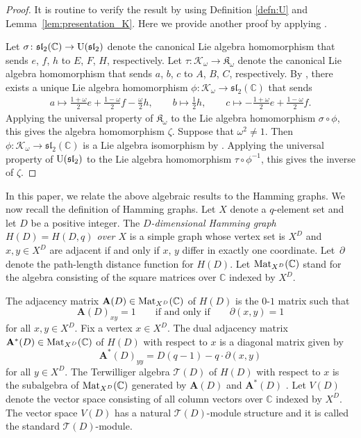 \documentclass[10pt,a4paper]{amsart}
\def\A{\mathbf A}
\def\C{\mathbb C}
\def\K{\mathfrak K_\omega}
\def\Mat{{\rm Mat}}
\def\T{\mathcal T}
\def\U{{\rm U}(\mathfrak{sl}_2)}
\numberwithin{equation}{section}
\begin{document}
\begin{proof}
It is routine to verify the result by using Definition \ref{defn:U} and Lemma~\ref{lem:presentation_K}. Here we provide another proof by applying \cite[Lemmas~2.12 and~2.13]{K&sl2}.

Let $\sigma\colon \mathfrak{sl}_2(\C)\to \U$ denote the canonical Lie algebra homomorphism that sends $e$, $f$, $h$ to $E$, $F$, $H$, respectively.
 Let $\tau\colon \mathcal K_\omega\to \K$ denote the canonical Lie algebra homomorphism that sends $a$, $b$, $c$ to $A$, $B$, $C$, respectively.
By \cite[Lemma 2.12]{K&sl2}, there exists a unique Lie algebra homomorphism $\phi\colon \mathcal K_\omega \to \mathfrak{sl}_2(\C)$ that sends
\begin{gather*}
a \mapsto \frac{1+\omega}{2} e+\frac{1-\omega}{2} f-\frac{\omega}{2} h,
\qquad
b \mapsto \frac{1}{2} h,
\qquad
c \mapsto -\frac{1+\omega}{2} e+\frac{1-\omega}{2} f.
\end{gather*}
Applying the universal property of $\K$ to the Lie algebra homomorphism $
\sigma\circ \phi$, this gives the algebra homomorphism $\zeta$. Suppose that $\omega^2\not=1$. Then $\phi\colon \mathcal K_\omega \to \mathfrak{sl}_2(\C)$ is a Lie algebra isomorphism by \cite[Lemma 2.13]{K&sl2}.
Applying the universal property of $\U$ to the Lie algebra homomorphism $\tau\circ \phi^{-1}$, this gives the inverse of $\zeta$.
\end{proof}



In this paper, we relate the above algebraic results to the Hamming graphs. We now recall the definition of Hamming graphs.
Let $X$ denote a $q$-element set and let $D$ be a positive integer.
The {\it $D$-dimensional Hamming graph $H(D)=H(D,q)$ over $X$} is a simple graph whose vertex set is $X^D$ and $x,y\in X^D$ are adjacent if and only if $x$, $y$ differ in exactly one coordinate. Let~$\partial$ denote the path-length distance function for $H(D)$.
Let $\Mat_{X^D}(\C)$ stand for the algebra consisting of the square matrices over $\C$ indexed by $X^D$.

The adjacency matrix $\A(D)\in \Mat_{X^D}(\C)$ of $H(D)$ is the $0$-$1$ matrix such that
\[
\A(D)_{xy}=1\qquad
\text{if and only if}\qquad
\partial(x,y)=1
\]
for all $x,y\in X^D$.
Fix a vertex $x\in X^D$. The dual adjacency matrix $\A^*(D)\in \Mat_{X^D}(\C)$ of $H(D)$ with respect to $x$ is a diagonal matrix given by
\[
\A^*(D)_{yy}=D(q-1)-q\cdot \partial(x,y)
\]
for all $y\in X^D$.
The Terwilliger algebra $\T(D)$ of $H(D)$ with respect to $x$ is the subalgebra of $\Mat_{X^D}(\C)$ generated by $\A(D)$ and $\A^*(D)$ \cite{TerAlgebraI,TerAlgebraII,TerAlgebraIII}.
Let $V(D)$ denote the vector space consisting of all column vectors over $\C$ indexed by $X^D$. The vector space $V(D)$ has a natural $\T(D)$-module structure and it is called the standard $\T(D)$-module.
\end{document}
